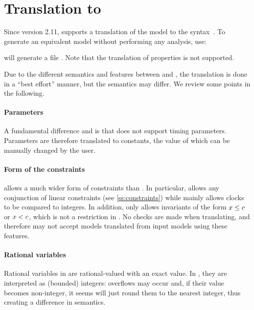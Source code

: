 \section{Translation to \uppaal{}}\label{section:uppaal}

Since version 2.11, \imitator{} supports a translation of the model to the \uppaal{} syntax~\cite{LPY97}.
To generate an equivalent \uppaal{} model without performing any analysis, use:


\imitator{} will generate a file .
Note that the translation of properties is not supported.

Due to the different semantics and features between \imitator{} and \uppaal{}, the translation is done in a ``best effort'' manner, but the semantics may differ.
We review some points in the following.

\paragraph{Parameters}
A fundamental difference \imitator{} and \uppaal{} is that \uppaal{} does not support timing parameters.
Parameters are therefore translated to constants, the value of which can be manually changed by the user.

\paragraph{Form of the constraints}
\imitator{} allows a much wider form of constraints than \uppaal{}.
In particular, \imitator{} allows any conjunction of linear constraints (see \cref{ss:constraints}) while \uppaal{} mainly allows clocks to be compared to integers.
In addition, \uppaal{} only allows invariants of the form $x \leq c$ or $x < c$, which is not a restriction in \imitator{}.
No checks are made when translating, and therefore \uppaal{} may not accept models translated from \imitator{} input models using these features.

\paragraph{Rational variables}
Rational variables in \imitator{} are rational-valued with an exact value.
In \uppaal{}, they are interpreted as (bounded) integers: overflows may occur and, if their value becomes non-integer, it seems \uppaal{} will just round them to the nearest integer, thus creating a difference in semantics.

